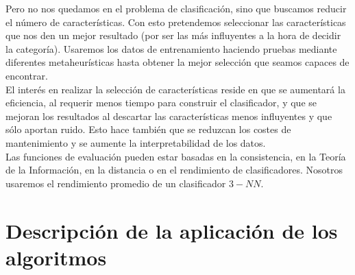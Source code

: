 \documentclass[11pt,leqno]{article}
\begin{document}
Pero no nos quedamos en el problema de clasificación, sino que buscamos reducir el número de características. Con esto pretendemos seleccionar las características que nos den un mejor resultado (por ser las más influyentes a la hora de decidir la categoría). Usaremos los datos de entrenamiento haciendo pruebas mediante diferentes metaheurísticas hasta obtener la mejor selección que seamos capaces de encontrar.\\  
El interés en realizar la selección de características reside en que se aumentará la eficiencia, al requerir menos tiempo para construir el clasificador, y que se mejoran los resultados al descartar las características menos influyentes y que sólo aportan ruido. Esto hace también que se reduzcan los costes de mantenimiento y se aumente la interpretabilidad de los datos.\\
Las funciones de evaluación pueden estar basadas en la consistencia, en la Teoría de la Información, en la distancia o en el rendimiento de clasificadores. Nosotros usaremos el rendimiento promedio de un clasificador $3-NN$.


\section{Descripción de la aplicación de los algoritmos}
\end{document}
